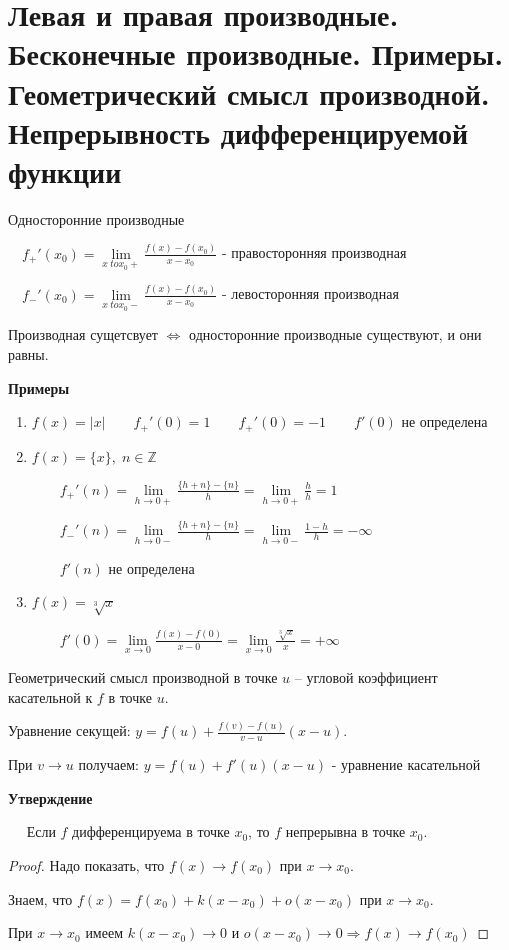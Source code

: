 \section{Левая и правая производные. Бесконечные производные. Примеры. Геометрический смысл производной. Непрерывность дифференцируемой функции}
\begin{conj}
    Односторонние производные

    $\quad f_{+}'(x_0) = \lim\limits_{x \ to x_0+} \frac{f(x) - f(x_0)}{x - x_0}$ - правосторонняя производная

    $\quad f_{-}'(x_0) = \lim\limits_{x \ to x_0-} \frac{f(x) - f(x_0)}{x - x_0}$ - левосторонняя производная
\end{conj}
\begin{notice}
    Производная сущетсвует $\Leftrightarrow$ односторонние производные существуют, и они равны.
\end{notice}


\textbf{Примеры}
\begin{enumerate}
    \item $f(x) = |x| \quad\quad f_{+}'(0) = 1 \quad\quad f_{+}'(0) = -1 \quad\quad f'(0)$ не определена
    \item $f(x) = \{x\}, \; n \in \mathbb{Z}$
    
    $\quad\quad f_{+}'(n) = \lim\limits_{h \to 0+} \frac{\{h + n\} - \{n\}}{h} = \lim\limits_{h \to 0+} \frac{h}{h} = 1$

    $\quad\quad f_{-}'(n) = \lim\limits_{h \to 0-} \frac{\{h + n\} - \{n\}}{h} = \lim\limits_{h \to 0-} \frac{1 - h}{h} = -\infty$

    $\quad\quad f'(n)$ не определена
    \item  $f(x) = \sqrt[3]{x}$
    
    $\quad\quad f'(0) = \lim\limits_{x \to 0} \frac{f(x) - f(0)}{x - 0} = \lim\limits_{x \to 0} \frac{\sqrt[3]{x}}{x} = +\infty$
\end{enumerate}
\begin{conj}
    Геометрический смысл производной в точке $u$ -- угловой коэффициент касательной к $f$ в точке $u$.
\end{conj}
Уравнение секущей: $y = f(u) + \frac{f(v) - f(u)}{v - u}(x - u)$. 

При $v \to u$ получаем: $y = f(u) + f'(u)(x - u)$ - уравнение касательной


\textbf{Утверждение} 

$\quad$ Если $f$ дифференцируема в точке $x_0$, то $f$ непрерывна в точке $x_0$.
\begin{proof}
    Надо показать, что $f(x) \to f(x_0)$ при $x \to x_0$.  
    
    Знаем, что $f(x) = f(x_0) + k(x - x_0) + o(x - x_0)$ при $x \to x_0$. 

    При $x \to x_0$ имеем $k(x - x_0) \to 0$ и $o(x - x_0) \to 0 \Rightarrow f(x) \to f(x_0)$ 
\end{proof}
